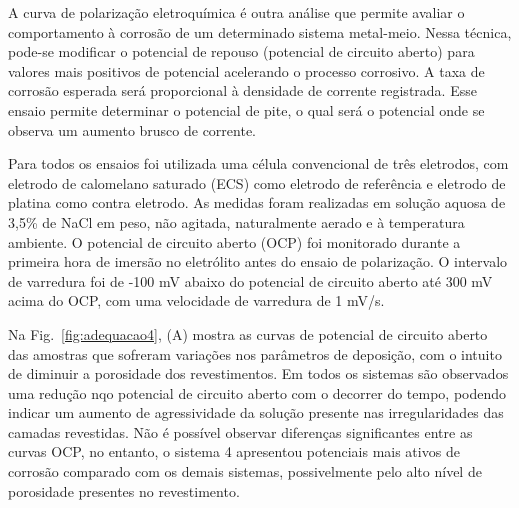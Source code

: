 A curva de polarização eletroquímica é outra análise que permite avaliar o
comportamento à corrosão de um determinado sistema metal-meio. Nessa técnica,
pode-se modificar o potencial de repouso (potencial de circuito aberto) para
valores mais positivos de potencial acelerando o processo corrosivo. A taxa de
corrosão esperada será proporcional à densidade de corrente registrada. Esse
ensaio permite determinar o potencial de pite, o qual será o potencial onde se
observa um aumento brusco de corrente.

Para todos os ensaios foi utilizada uma célula convencional de três eletrodos,
com eletrodo de calomelano saturado (ECS) como eletrodo de referência e eletrodo
de platina como contra eletrodo. As medidas foram realizadas em solução aquosa
de 3,5\% de NaCl em peso, não agitada, naturalmente aerado e à temperatura
ambiente. O potencial de circuito aberto (OCP) foi monitorado durante a primeira
hora de imersão no eletrólito antes do ensaio de polarização. O intervalo de
varredura foi de -100 mV abaixo do potencial de circuito aberto até 300 mV acima
do OCP, com uma velocidade de varredura de 1 mV/s.

Na Fig.~\ref{fig:adequacao4}, (A) mostra as curvas de potencial de circuito
aberto das amostras que sofreram variações nos parâmetros de deposição, com o
intuito de diminuir a porosidade dos revestimentos. Em todos os sistemas são
observados uma redução nqo potencial de circuito aberto com o decorrer do tempo,
podendo indicar um aumento de agressividade da solução presente nas irregularidades das camadas revestidas.
Não é possível observar diferenças significantes entre as curvas OCP, no
entanto, o sistema 4 apresentou potenciais mais ativos de corrosão comparado com
os demais sistemas, possivelmente pelo alto nível de porosidade presentes no
revestimento.


